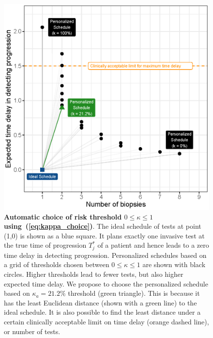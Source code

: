 \begin{figure}
\centerline{\includegraphics{images/kappa_choice_102.eps}}
\caption{\textbf{Automatic choice of risk threshold $0 \leq \kappa \leq 1$ using~(\ref{eq:kappa_choice})}. The ideal schedule of tests at point (1,0) is shown as a blue square. It plans exactly one invasive test at the true time of progression $T^*_j$ of a patient and hence leads to a zero time delay in detecting progression. Personalized schedules based on a grid of thresholds chosen between $0 \leq \kappa \leq 1$ are shown with black circles. Higher thresholds lead to fewer tests, but also higher expected time delay. We propose to choose the personalized schedule based on $\kappa_a=21.2\%$ threshold (green triangle). This is because it has the least Euclidean distance (shown with a green line) to the ideal schedule. It is also possible to find the least distance under a certain clinically acceptable limit on time delay (orange dashed line), or number of tests.}
\label{fig:kappa_choice}
\end{figure}

